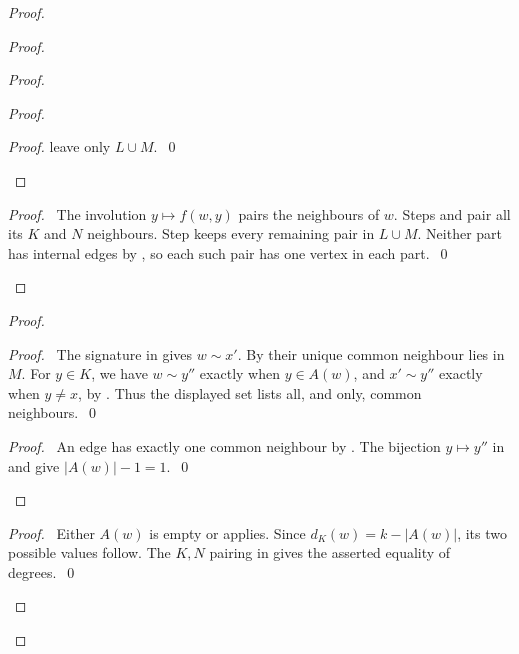 \begin{proof}
\begin{proof}
\begin{proof}
\begin{proof}
\begin{proof}
     leave only $L\cup M$.~\qed\end{proof}
   \end{proof}
   \qedstep
   \begin{proof}
    \pf\ The involution $y\mapsto f(w,y)$ pairs the neighbours of $w$.
    Steps  and  pair all its $K$ and $N$ neighbours.
    Step  keeps every remaining pair in $L\cup M$.
    Neither part has internal edges by , so each such pair has
    one vertex in each part.~\qed
   \end{proof}
  \end{proof}
  \begin{proof}
   \begin{proof}
    \pf\ The signature in  gives $w\sim x'$.
    By  their unique common neighbour lies in $M$.
    For $y\in K$, we have $w\sim y''$ exactly when $y\in A(w)$, and
    $x'\sim y''$ exactly when $y\ne x$, by .
    Thus the displayed set lists all, and only, common neighbours.~\qed
   \end{proof}
   \qedstep
   \begin{proof}
    \pf\ An edge has exactly one common neighbour by .
    The bijection $y\mapsto y''$ in  and 
    give $|A(w)|-1=1$.~\qed
   \end{proof}
  \end{proof}
  \qedstep
  \begin{proof}
   \pf\ Either $A(w)$ is empty or  applies.
   Since $d_K(w)=k-|A(w)|$, its two possible values follow.
   The $K,N$ pairing in  gives the asserted equality of degrees.~\qed
  \end{proof}
 \end{proof}


\end{proof}
